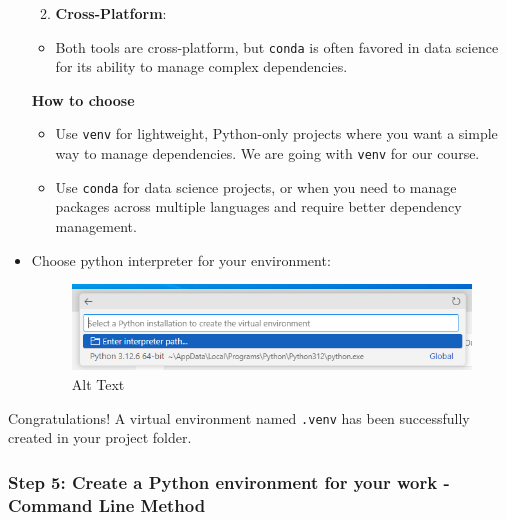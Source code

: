 \documentclass[
  letterpaper,
  DIV=11,
  numbers=noendperiod]{scrreprt}
\providecommand{\tightlist}{%
  \setlength{\itemsep}{0pt}\setlength{\parskip}{0pt}}\usepackage{longtable,booktabs,array}
\begin{document}
\begin{itemize}
  \begin{enumerate}
  \def\labelenumi{\arabic{enumi}.}
  \setcounter{enumi}{3}
  \tightlist
  \item
    \textbf{Cross-Platform}:
  \end{enumerate}

  \begin{itemize}
  \tightlist
  \item
    Both tools are cross-platform, but \texttt{conda} is often favored
    in data science for its ability to manage complex dependencies.
  \end{itemize}

  \textbf{How to choose}

  \begin{itemize}
  \tightlist
  \item
    Use \texttt{venv} for lightweight, Python-only projects where you
    want a simple way to manage dependencies. We are going with
    \texttt{venv} for our course.
  \item
    Use \texttt{conda} for data science projects, or when you need to
    manage packages across multiple languages and require better
    dependency management.
  \end{itemize}
\item
  Choose python interpreter for your environment:

  \begin{figure}

  {\centering \includegraphics{images/interpreter.png}

  }

  \caption{Alt Text}

  \end{figure}
\end{itemize}

Congratulations! A virtual environment named \texttt{.venv} has been
successfully created in your project folder.

\hypertarget{step-5-create-a-python-environment-for-your-work---command-line-method}{%
\subsubsection{Step 5: Create a Python environment for your work -
Command Line
Method}\label{step-5-create-a-python-environment-for-your-work---command-line-method}}
\end{document}
